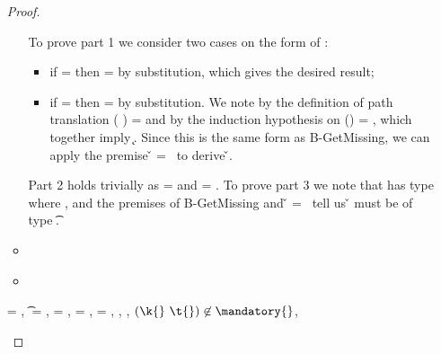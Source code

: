 \begin{lemma}
\begin{enumerate}
\begin{proof}
\begin{case}[T-GetHMapAbsent]
\begin{itemize}
\begin{subcase}[B-GetMissing]
         To prove part 1 we consider two cases on the form of : 
         \begin{itemize}
           \item
         if {} = \emptyobject{}
         then \object{} = \emptyobject{} by substitution, which gives the desired result;
           \item
         if  = { {}}
         then \object{} = { {}} by substitution.
         We note by the definition of path translation
         {\openv{}}({ {}}) =
         {}
         and by the induction hypothesis on 
         {{\openv{}}()} = {},
         which together imply 
         \inopenv {\openv{}} {\object{}} { {\k{}}}.
         Since this is the same form as B-GetMissing, we can apply the premise
        \v{} = \nil\ 
         to derive \inopenv {\openv{}} {\object{}} {\v{}}.
         \end{itemize}
         
         Part 2 holds trivially as \thenprop{\prop{}} = {\topprop{}}
         and \elseprop{\prop{}} = {\topprop{}}.
         To prove part 3 we note that  has type {\HMapgeneric {\mandatory{}} {\absent{}}}
         where {\inabsent{\k{}}{\absent{}}}, and
         the premises of B-GetMissing
         and
          \v{} = \nil\ 
         tell us {\v{}} must be of type {\t{}}.
      \end{subcase}
    \item[]
      \begin{subcase}[BE-Get1]
      \end{subcase}
    \item[]
      \begin{subcase}[BE-Get2]
      \end{subcase}
  \end{itemize}
\end{case}

\begin{case}[T-GetHMapPartialDefault]
  \e{} = { {}},
  \t{} = \Top,
  \thenprop{\prop{}} = {\topprop{}},
  \elseprop{\prop{}} = {\topprop{}},
  \object{} = {\replacefor
               { {\x{}}}
                          {}
                          {\x{}}},
 \judgement {\propenv{}} { {\HMapp {\mandatory{}} {\absent}}}
           { {}}
           {\object{m}},
  \judgementtwo {\propenv{}} {\hastype {\e{k}} {\Value {k}}},
             ${\notinmandatory{\k{}}{\t{}}{\mandatory{}}}$,
             {\notinabsent{\k{}}{\absent{}}}


\end{case}
\end{proof}
\end{enumerate}
\end{lemma}
